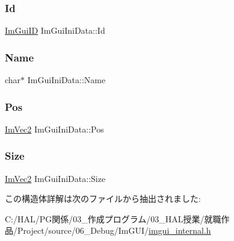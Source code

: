 \subsubsection{\texorpdfstring{Id}{Id}}
{\footnotesize\ttfamily \mbox{\hyperlink{imgui_8h_a1785c9b6f4e16406764a85f32582236f}{Im\+Gui\+ID}} Im\+Gui\+Ini\+Data\+::\+Id}

\mbox{\label{struct_im_gui_ini_data_aef4db96cc7332d492bba873028a00f66}} 
\subsubsection{\texorpdfstring{Name}{Name}}
{\footnotesize\ttfamily char$\ast$ Im\+Gui\+Ini\+Data\+::\+Name}

\mbox{\label{struct_im_gui_ini_data_a8598c0d937901fc22f808f11f9aa6bac}} 
\subsubsection{\texorpdfstring{Pos}{Pos}}
{\footnotesize\ttfamily \mbox{\hyperlink{struct_im_vec2}{Im\+Vec2}} Im\+Gui\+Ini\+Data\+::\+Pos}

\mbox{\label{struct_im_gui_ini_data_af3d56b3e89c45d07d7927ab95dbd86fa}} 
\subsubsection{\texorpdfstring{Size}{Size}}
{\footnotesize\ttfamily \mbox{\hyperlink{struct_im_vec2}{Im\+Vec2}} Im\+Gui\+Ini\+Data\+::\+Size}



この構造体詳解は次のファイルから抽出されました\+:\begin{DoxyCompactItemize}
\item 
C\+:/\+H\+A\+L/\+P\+G関係/03\+\_\+作成プログラム/03\+\_\+\+H\+A\+L授業/就職作品/\+Project/source/06\+\_\+\+Debug/\+Im\+G\+U\+I/\mbox{\hyperlink{imgui__internal_8h}{imgui\+\_\+internal.\+h}}\end{DoxyCompactItemize}
